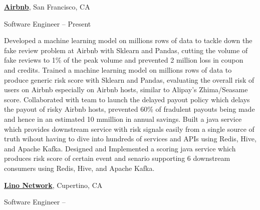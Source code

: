 \documentclass[letterpaper,MMMyyyy,nonstopmode]{simpleresumecv}
\begin{document}
\begin{Body}
\BigGap
\Entry
\href{https://press.airbnb.com/about-us/}
{\textbf{Airbnb}},
San Francisco, CA

\Gap
\BulletItem
Software Engineer
\hfill
{} --
Present
\begin{Detail}
\SubBulletItem
Developed a machine learning model on millions rows of data to tackle down the fake review problem at Airbnb with Sklearn and Pandas, cutting the volume of fake reviews to 1\% of the peak volume and prevented 2 million loss in coupon and credits.
\SubBulletItem
Trained a machine learning model on millions rows of data to produce generic risk score with Sklearn and Pandas, evaluating the overall risk of users on Airbnb especially on Airbnb hosts, similar to Alipay's Zhima/Seasame score.
\SubBulletItem
Collaborated with team to launch the delayed payout policy which delays the payout of risky Airbnb hosts, prevented 60\% of fradulent payouts being made and hence in an estimated 10 mmillion in annual savings.
\SubBulletItem
Built a java service which provides downstream service with risk signals easily from a single source of truth wihout having to dive into hundreds of services and APIs using Redis, Hive, and Apache Kafka.
\SubBulletItem
Designed and Implemented a scoring java service which produces risk score of certain event and senario supporting 6 downstream consumers using Redis, Hive, and Apache Kafka.
\end{Detail}

\BigGap
\Entry
\href{https://lino.network/}
{\textbf{Lino Network}},
Cupertino, CA

\Gap
\BulletItem
Software Engineer
\hfill
{} --


\end{Body}
\end{document}
